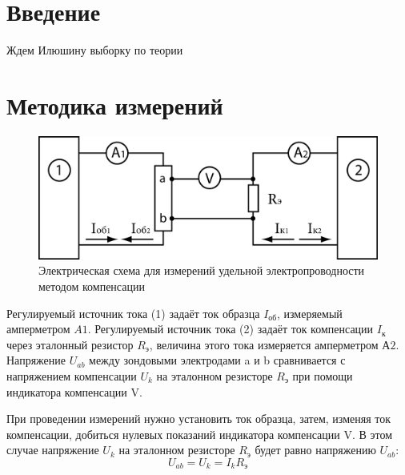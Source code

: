 

\renewcommand{\phi}{\varphi}



\def\labauthors{Виноградов И.Д., Шиков А.П.}
\def\labgroup{430}
\def\labnumber{1}
\def\labtheme{Измерение ширины запрещенной зоны}



\newpage
\section*{Введение}
Ждем Илюшину выборку по теории


\newpage
\section{Методика измерений}

\begin{figure}[h!]
	\centering
	\includegraphics[width = .9\linewidth]{img/scheme.jpg}
	\caption{Электрическая схема для измерений удельной электропроводности методом компенсации}
	\label{fig:5.1}
\end{figure}

Регулируемый источник тока (1) задаёт ток образца $I_\text{об}$, измеряемый амперметром $A1$. Регулируемый источник тока
(2) задаёт ток компенсации $I_\text{к}$ через эталонный резистор $R_\text{э}$, величина этого тока измеряется
амперметром $А2$. Напряжение $U_{ab}$ между зондовыми электродами a и b сравнивается с напряжением компенсации $U_k$ на
эталонном резисторе $R_\text{э}$ при помощи индикатора компенсации V.

При проведении измерений нужно установить ток образца, затем, изменяя ток компенсации, добиться нулевых показаний
индикатора компенсации V. В этом случае напряжение $U_k$ на эталонном резисторе $R_\text{э}$ будет равно напряжению $U_{ab}$:
\begin{equation}
	U_{ab}=U_{k}=I_{k} R_{\text{э}} 
	\label{eq:5.1}
\end{equation}

